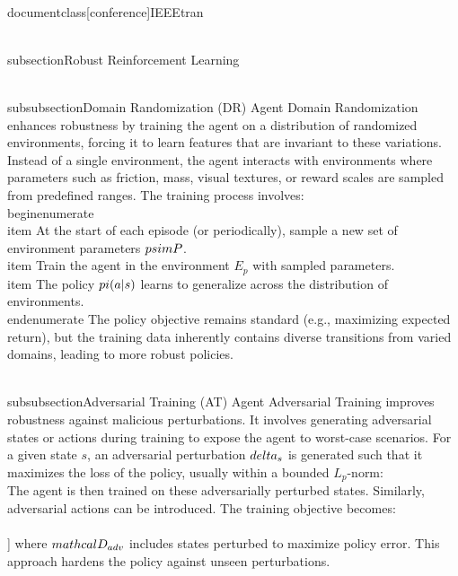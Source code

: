 \\documentclass[conference]{IEEEtran}
\begin{document}
\\subsection{Robust Reinforcement Learning}

\\subsubsection{Domain Randomization (DR) Agent}
Domain Randomization enhances robustness by training the agent on a distribution of randomized environments, forcing it to learn features that are invariant to these variations. Instead of a single environment, the agent interacts with environments where parameters such as friction, mass, visual textures, or reward scales are sampled from predefined ranges.
The training process involves:
\\begin{enumerate}
    \\item At the start of each episode (or periodically), sample a new set of environment parameters $p \\sim P$.
    \\item Train the agent in the environment $E_p$ with sampled parameters.
    \\item The policy $\\pi(a|s)$ learns to generalize across the distribution of environments.
\\end{enumerate}
The policy objective remains standard (e.g., maximizing expected return), but the training data inherently contains diverse transitions from varied domains, leading to more robust policies.

\\subsubsection{Adversarial Training (AT) Agent}
Adversarial Training improves robustness against malicious perturbations. It involves generating adversarial states or actions during training to expose the agent to worst-case scenarios.
For a given state $s$, an adversarial perturbation $\\delta_s$ is generated such that it maximizes the loss of the policy, usually within a bounded $L_p$-norm:
\\[
\\delta_s = \\arg\\max_{||\\delta||_p \\le \\epsilon} L(\\theta, s+\\delta, a)
\\]
The agent is then trained on these adversarially perturbed states. Similarly, adversarial actions can be introduced. The training objective becomes:
\\[
\\min_{\\theta} \\mathbb{E}_{s,a,r,s' \\sim \\mathcal{D}_{adv}} \\left[ L(\\theta, s, a) \\right]
\\]
where $\\mathcal{D}_{adv}$ includes states perturbed to maximize policy error. This approach hardens the policy against unseen perturbations.
\end{document}
